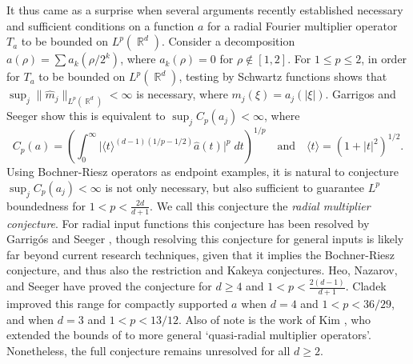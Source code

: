 \documentclass[11pt]{article}
\DeclareMathOperator{\RR}{\mathbb{R}}
\begin{document}
It thus came as a surprise when several arguments \cites{GarrigosSeeger,HeoNazarovSeeger,Cladek,KimQuasiradial} recently established necessary and sufficient conditions on a function $a$ for a radial Fourier multiplier operator $T_a$ to be bounded on $L^p(\RR^d)$.
Consider a decomposition $a(\rho) = \sum a_k( \rho / 2^k)$, where $a_k(\rho) = 0$ for $\rho \not \in [1,2]$. For $1 \leq p \leq 2$, in order for $T_a$ to be bounded on $L^p(\RR^d)$, testing by Schwartz functions shows that $\sup_j \| \widehat{m}_j \|_{L^p(\RR^d)} < \infty$ is necessary, where $m_j(\xi) = a_j(|\xi|)$. Garrigos and Seeger \cite{GarrigosSeeger} show this is equivalent to $\sup_j C_p(a_j) < \infty$, where
%
\[ C_p(a) = \left( \int_0^\infty \big| \langle t \rangle^{(d-1)(1/p - 1/2)} \widehat{a}(t) \big|^p\; dt \right)^{1/p} \quad\text{and}\quad \langle t \rangle = (1 + |t|^2)^{1/2}. \] %
%
Using Bochner-Riesz operators as endpoint examples, it is natural to conjecture $\sup_j C_p(a_j) < \infty$ is not only necessary, but also sufficient to guarantee $L^p$ boundedness for $1 < p < {\scriptstyle \frac{2d}{d+1}}$. We call this conjecture the \emph{radial multiplier conjecture}. For radial input functions this conjecture has been resolved by Garrig\'{o}s and Seeger \cite{GarrigosandSeeger}, though resolving this conjecture for general inputs is likely far beyond current research techniques, given that it implies the Bochner-Riesz conjecture, and thus also the restriction and Kakeya conjectures. Heo, Nazarov, and Seeger \cite{HeoNazarovSeeger} have proved the conjecture for $d \geq 4$ and $1 < p < {\scriptstyle \frac{2(d-1)}{d+1}}$. Cladek \cite{Cladek} improved this range for compactly supported $a$ when $d = 4$ and $1 < p < 36/29$, and when $d = 3$ and $1 < p < 13/12$. Also of note is the work of Kim \cite{KimQuasiradial}, who extended the bounds of \cite{HeoNazarovSeeger} to more general `quasi-radial multiplier operators'. Nonetheless, the full conjecture remains unresolved for all $d \geq 2$. %
\end{document}
